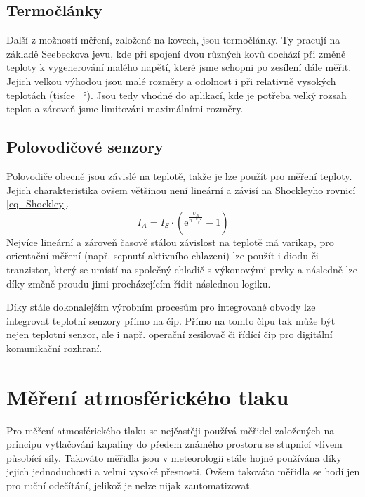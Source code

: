 \subsection{Termočlánky}

Další z možností měření, založené na kovech, jsou termočlánky. Ty pracují na základě Seebeckova jevu, kde při spojení dvou různých kovů dochází při změně teploty k vygenerování malého napětí, které jsme schopni po zesílení dále měřit. Jejich velkou výhodou jsou malé rozměry a odolnost i při relativně vysokých teplotách (tisíce \SI{}{\degree}). Jsou tedy vhodné do aplikací, kde je potřeba velký rozsah teplot a zároveň jsme limitováni maximálními rozměry.

\subsection{Polovodičové senzory}

Polovodiče obecně jsou závislé na teplotě, takže je lze použít pro měření teploty. Jejich charakteristika ovšem většinou není lineární a závisí na Shockleyho rovnicí \eqref{eq_Shockley}.
\begin{equation}
    I_A =I_S \cdot (\mathrm{e} ^{\frac{U_A}{n \cdot \frac{k \cdot T}{q}}} - 1)
    \label{eq_Shockley}
\end{equation}
Nejvíce lineární a zároveň časově stálou závislost na teplotě má varikap, pro orientační měření (např. sepnutí aktivního chlazení) lze použít i diodu či tranzistor, který se umístí na společný chladič s výkonovými prvky a následně lze díky změně proudu jimi procházejícím řídit následnou logiku.

Díky stále dokonalejším výrobním procesům pro integrované obvody lze integrovat teplotní senzory přímo na čip. Přímo na tomto čipu tak může být nejen teplotní senzor, ale i např. operační zesilovač či řídící čip pro digitální komunikační rozhraní.

\section{Měření atmosférického tlaku}

Pro měření atmosférického tlaku se nejčastěji používá měřidel založených na principu vytlačování kapaliny do předem známého prostoru se stupnicí vlivem působící síly. Takováto měřidla jsou v meteorologii stále hojně používána díky jejich jednoduchosti a velmi vysoké přesnosti. Ovšem takováto měřidla se hodí jen pro ruční odečítání, jelikož je nelze nijak zautomatizovat.

